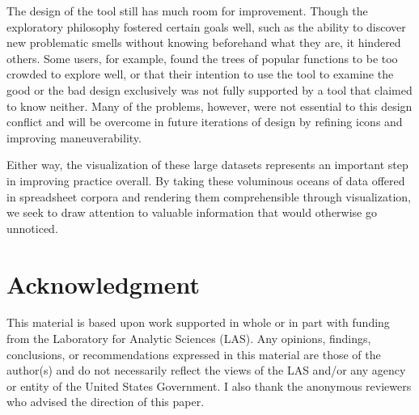 \documentclass[conference]{IEEEtran}
\begin{document}
	The design of the tool still has much room for improvement. Though the
	exploratory philosophy fostered certain goals well, such as the ability to
	discover new problematic smells without knowing beforehand what they are, it
	hindered others. Some users, for example, found the trees of popular functions
	to be too crowded to explore well, or that their intention to use the tool to
	examine the good or the bad design exclusively was not fully supported by a
	tool that claimed to know neither. Many of the problems, however, were not
	essential to this design conflict and will be overcome in future iterations of
	design by refining icons and improving maneuverability.
	
	Either way, the visualization of these large datasets represents an important
	step in improving practice overall. By taking these voluminous oceans of data
	offered in spreadsheet corpora and rendering them comprehensible through
	visualization, we seek to draw attention to valuable information that would
	otherwise go unnoticed.
	
	\section*{Acknowledgment}
	
	This material is based upon work supported in whole or in part with funding
	from the Laboratory for Analytic Sciences (LAS). Any opinions, findings,
	conclusions, or recommendations expressed in this material are those of the
	author(s) and do not necessarily reflect the views of the LAS and/or any agency
	or entity of the United States Government. I also thank the anonymous reviewers
	who advised the direction of this paper.
	
	
	
	
	
	
\end{document}
